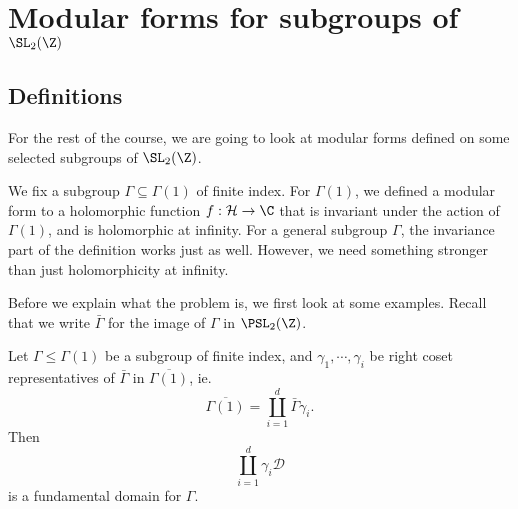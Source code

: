 \documentclass[a4paper]{article}
\renewcommand{\H}{\mathcal{H}}
\begin{document}
\section{Modular forms for subgroups of \texorpdfstring{$\SL_2(\Z)$}{SL2(Z)}}
\subsection{Definitions}
For the rest of the course, we are going to look at modular forms defined on some selected subgroups of $\SL_2(\Z)$.

We fix a subgroup $\Gamma \subseteq \Gamma(1)$ of finite index. For $\Gamma(1)$, we defined a modular form to a holomorphic function $f: \H \to \C$ that is invariant under the action of $\Gamma(1)$, and is holomorphic at infinity. For a general subgroup $\Gamma$, the invariance part of the definition works just as well. However, we need something stronger than just holomorphicity at infinity.

Before we explain what the problem is, we first look at some examples. Recall that we write $\bar{\Gamma}$ for the image of $\Gamma$ in $\PSL_2(\Z)$.

\begin{lemma}
  Let $\Gamma \leq \Gamma(1)$ be a subgroup of finite index, and $\gamma_1, \cdots, \gamma_i$ be right coset representatives of $\bar{\Gamma}$ in $\overline{\Gamma(1)}$, ie.
  \[
    \overline{\Gamma(1)} = \coprod_{i = 1}^d \bar{\Gamma} \gamma_i.
  \]
  Then
  \[
    \coprod_{i = 1}^d \gamma_i \mathcal{D}
  \]
  is a fundamental domain for $\Gamma$.
\end{lemma}
\end{document}
